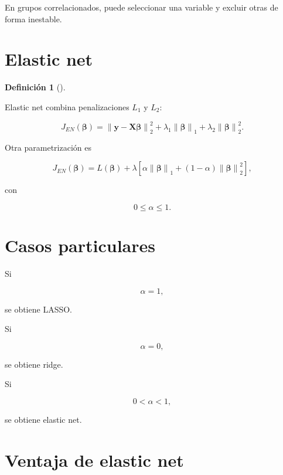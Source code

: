 \documentclass[
  spanish,
  10.5pt,
  letterpaper,
  DIV=11,
  numbers=noendperiod,
  oneside,
  open=any]{scrreprt}
\theoremstyle{definition}
\newtheorem{definition}{Definición}[chapter]
\theoremstyle{definition}
\theoremstyle{plain}
\theoremstyle{remark}
\begin{document}
En grupos correlacionados, puede seleccionar una variable y excluir
otras de forma inestable.

\section*{Elastic net}\label{elastic-net}


\begin{definition}[]\protect\hypertarget{def-elastic-net}{}\label{def-elastic-net}

Elastic net combina penalizaciones \(L_1\) y \(L_2\):

\[
J_{EN}(\boldsymbol{\beta})
=
\left\|
\mathbf{y}
-
\mathbf{X}\boldsymbol{\beta}
\right\|_2^2
+
\lambda_1
\left\|
\boldsymbol{\beta}
\right\|_1
+
\lambda_2
\left\|
\boldsymbol{\beta}
\right\|_2^2.
\]

\end{definition}

Otra parametrización es

\[
J_{EN}(\boldsymbol{\beta})
=
L(\boldsymbol{\beta})
+
\lambda
\left[
\alpha
\left\|
\boldsymbol{\beta}
\right\|_1
+
(1-\alpha)
\left\|
\boldsymbol{\beta}
\right\|_2^2
\right],
\]

con

\[
0\leq\alpha\leq 1.
\]

\section*{Casos particulares}\label{casos-particulares}


Si

\[
\alpha=1,
\]

se obtiene LASSO.

Si

\[
\alpha=0,
\]

se obtiene ridge.

Si

\[
0<\alpha<1,
\]

se obtiene elastic net.

\section*{Ventaja de elastic net}\label{ventaja-de-elastic-net}
\end{document}

